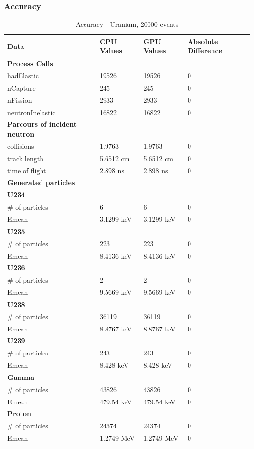 \documentclass[12pt]{article}
\begin{document}
	\subsubsection{Accuracy}
		\begin{table}[H]
		\centering
		\caption{Accuracy - Uranium, 20000 events}\label{sys5Acc}
		\begin{tabular}{llll}
		\toprule
		\bf Data &  \bf CPU Values &  \bf GPU Values &  \bf Absolute Difference\\\midrule
		\bf Process Calls&&&\\
		hadElastic&19526&19526&0\\
		nCapture&245&245&0\\
		nFission&2933&2933&0\\
		neutronInelastic&16822&16822&0\\ 
		
		\midrule
		\bf Parcours of incident neutron&&&\\
		collisions&1.9763&1.9763&0\\
		track length&5.6512 cm&5.6512 cm&0\\
		time of flight&2.898 ns&2.898 ns&0\\

		\midrule
		\bf Generated particles&&&\\
		\bf{U234}&&&\\
		\# of particles&6&6&0\\
		Emean&3.1299 keV&3.1299 keV&0\\
		
		\bf{U235}&&&\\
		\# of particles&223&223&0\\
		Emean&8.4136 keV&8.4136 keV&0\\
		
		\bf{U236}&&&\\
		\# of particles&2&2&0\\
		Emean&9.5669 keV&9.5669 keV&0\\
		
		\bf{U238}&&&\\
		\# of particles&36119&36119&0\\
		Emean&8.8767 keV&8.8767 keV&0\\
		
		\bf{U239}&&&\\
		\# of particles&243&243&0\\
		Emean&8.428 keV&8.428 keV&0\\
		\bf{Gamma}&&&\\
		\# of particles&43826&43826&0\\
		Emean&479.54 keV&479.54 keV&0\\
		\bf{Proton}&&&\\
		\# of particles&24374&24374&0\\
		Emean&1.2749 MeV&1.2749 MeV&0\\\bottomrule
		\end{tabular}
		\end{table}
\end{document}
